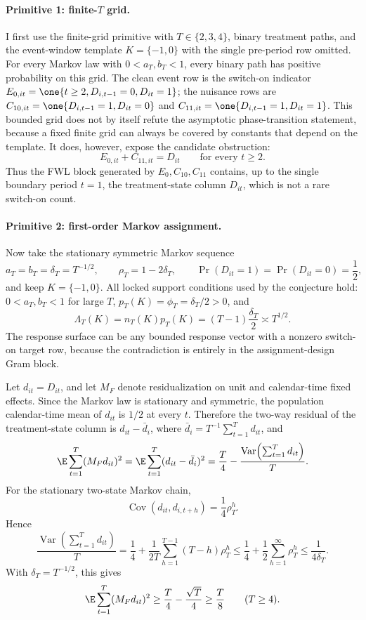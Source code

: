 \paragraph{Primitive 1: finite-\(T\) grid.}
I first use the finite-grid primitive with \(T\in\{2,3,4\}\), binary treatment paths, and the event-window template \(K=\{-1,0\}\) with the single pre-period row omitted.
For every Markov law with \(0<a_T,b_T<1\), every binary path has positive probability on this grid.
The clean event row is the switch-on indicator \(E_{0,it}=\one\{t\ge2,D_{i,t-1}=0,D_{it}=1\}\); the nuisance rows are \(C_{10,it}=\one\{D_{i,t-1}=1,D_{it}=0\}\) and \(C_{11,it}=\one\{D_{i,t-1}=1,D_{it}=1\}\).
This bounded grid does not by itself refute the asymptotic phase-transition statement, because a fixed finite grid can always be covered by constants that depend on the template.
It does, however, expose the candidate obstruction:
\[
E_{0,it}+C_{11,it}
=D_{it}\qquad\text{for every }t\ge2.
\]
Thus the FWL block generated by \(E_0,C_{10},C_{11}\) contains, up to the single boundary period \(t=1\), the treatment-state column \(D_{it}\), which is not a rare switch-on count.

\paragraph{Primitive 2: first-order Markov assignment.}
Now take the stationary symmetric Markov sequence
\[
a_T=b_T=\delta_T=T^{-1/2},\qquad
\rho_T=1-2\delta_T,\qquad
\Pr(D_{it}=1)=\Pr(D_{it}=0)=\frac12,
\]
and keep \(K=\{-1,0\}\).
All locked support conditions used by the conjecture hold: \(0<a_T,b_T<1\) for large \(T\), \(p_T(K)=\phi_T=\delta_T/2>0\), and
\[
\Lambda_T(K)=n_T(K)p_T(K)=(T-1)\frac{\delta_T}{2}\asymp T^{1/2}.
\]
The response surface can be any bounded response vector with a nonzero switch-on target row, because the contradiction is entirely in the assignment-design Gram block.

Let \(d_{it}=D_{it}\), and let \(M_F\) denote residualization on unit and calendar-time fixed effects.
Since the Markov law is stationary and symmetric, the population calendar-time mean of \(d_{it}\) is \(1/2\) at every \(t\).
Therefore the two-way residual of the treatment-state column is \(d_{it}-\bar d_i\), where \(\bar d_i=T^{-1}\sum_{t=1}^T d_{it}\), and
\[
\E\sum_{t=1}^T (M_F d_{it})^2
=
\E\sum_{t=1}^T (d_{it}-\bar d_i)^2
=
\frac{T}{4}-\frac{\operatorname{Var}\!\left(\sum_{t=1}^T d_{it}\right)}{T}.
\]
For the stationary two-state Markov chain,
\[
\operatorname{Cov}(d_{it},d_{i,t+h})=\frac14\rho_T^h.
\]
Hence
\[
\frac{\operatorname{Var}\!\left(\sum_{t=1}^T d_{it}\right)}{T}
=
\frac14+\frac{1}{2T}\sum_{h=1}^{T-1}(T-h)\rho_T^h
\le
\frac14+\frac12\sum_{h=1}^{\infty}\rho_T^h
\le
\frac{1}{4\delta_T}.
\]
With \(\delta_T=T^{-1/2}\), this gives
\[
\E\sum_{t=1}^T (M_F d_{it})^2
\ge
\frac{T}{4}-\frac{\sqrt T}{4}
\ge
\frac{T}{8}
\qquad (T\ge4).
\]

